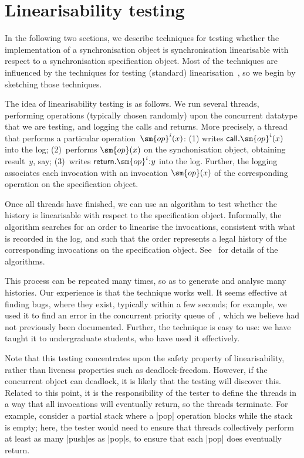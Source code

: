 \section{Linearisability testing}
\label{sec:lin-testing}

In the following two sections, we describe techniques for testing whether the
implementation of a synchronisation object is synchronisation linearisable
with respect to a synchronisation specification object.
%
Most of the techniques are influenced by the techniques for testing (standard)
linearisation~\cite{gavin:lin-testing}, so we begin by sketching those
techniques.

The idea of linearisability testing is as follows.  We run several threads,
performing operations (typically chosen randomly) upon the concurrent datatype
that we are testing, and logging the calls and returns.  More precisely, a
thread that performs a particular operation~$\sm{op}^i(x)$: (1) writes
$\call.\sm{op}^i(x)$ into the log; (2)~performs $\sm{op}(x)$ on the
synchonisation object, obtaining result~$y$, say; (3)~writes
$\return.\sm{op}^i \:: y$ into the log.  Further, the logging associates each
invocation with an invocation $\sm{op}(x)$ of the corresponding operation
on the specification object.

Once all threads have finished, we can use an algorithm to test whether the
history is linearisable with respect to the specification object.  Informally,
the algorithm searches for an order to linearise the invocations, consistent
with what is recorded in the log, and such that the order represents a legal
history of the corresponding invocations on the specification object.
See~\cite{gavin:lin-testing} for details of the algorithms.

This process can be repeated many times, so as to generate and analyse many
histories.  Our experience is that the technique works well.  It seems
effective at finding bugs, where they exist, typically within a few seconds;
for example, we used it to find an error in the concurrent priority queue
of~\cite{faulty-pri-queue}, which we believe had not previously been
documented.  Further, the technique is easy to use: we have taught it to
undergraduate students, who have used it effectively.

Note that this testing concentrates upon the safety property of linearisability,
rather than liveness properties such as deadlock-freedom.  However, if the
concurrent object can deadlock, it is likely that the testing will discover
this.  Related to this point, it is the responsibility of the tester to define
the threads in a way that all invocations will eventually return, so the
threads terminate.  For example, consider a partial stack where a |pop|
operation blocks while the stack is empty; here, the tester would need to
ensure that threads collectively perform at least as many |push|es as |pop|s,
to ensure that each |pop| does eventually return.

